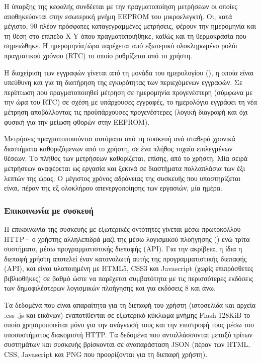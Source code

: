 Η ύπαρξης της κεφαλής συνδέεται με την πραγματοποίηση μετρήσεων οι οποίες
αποθηκεύονται στην εσωτερική μνήμη EEPROM του μικροελεγκτή. Οι, κατά μέγιστο, 90
πλέον πρόσφατες καταγεγραμμένες μετρήσεις, φέρουν την ημερομηνία και τη θέση στο
επίπεδο X-Y όπου πραγματοποιήθηκε, καθώς και τη θερμοκρασία που σημειώθηκε.
Η ημερομηνία\slash{}ώρα παρέχεται από εξωτερικό ολοκληρωμένο ρολόι πραγματικού
χρόνου (RTC) το οποίο ρυθμίζεται από το χρήστη.

Η διαχείριση των εγγραφών γίνεται από τη μονάδα του ημερολογίου (), η
οποία είναι υπεύθυνη και για τη διατήρηση της εγκυρότητας των περιεχόμενων
εγγραφών. Σε περίπτωση που πραγματοποιηθεί μέτρηση σε ημερομηνία προγενέστερη
(σύμφωνα με την ώρα του RTC) σε σχέση με υπάρχουσες εγγραφές, το ημερολόγιο
εγγράφει τη νέα μέτρηση αποβάλλοντας τις προϋπάρχουσες προγενέστερες (λογική
διαγραφή και όχι φυσική για την μείωση φθορών στην EEPROM).

Μετρήσεις πραγματοποιούνται αυτόματα από τη συσκευή ανά σταθερά χρονικά
διαστήματα καθοριζόμενων από το χρήστη, σε ένα πλήθος τυχαία επιλεγμένων θέσεων.
Το πλήθος των μετρήσεων καθορίζεται, επίσης, από το χρήστη. Μία σειρά μετρήσεων
αναφέρεται ως εργασία και ξεκινά σε διαστήματα πολλαπλάσια των έξι λεπτών της
ώρας. Ο μέγιστος χρόνος αδράνειας της συσκευής που υποστηρίζεται είναι, πέραν
της εξ ολοκλήρου απενεργοποίησης των εργασιών, μία ημέρα.


\subsubsection{Επικοινωνία με συσκευή}

Η επικοινωνία της συσκευής με εξωτερικές οντότητες γίνεται μέσω πρωτοκόλλου
HTTP· ο χρήστης αλληλεπιδρά μαζί της μέσω λογισμικού πλοήγησης ()
ενώ τρίτα συστήματα, μέσω προγραμματιστικής διεπαφής (API).
Για την ακρίβεια, η ίδια η διεπαφή χρήστη αποτελεί έναν καταναλωτή αυτής της
προγραμματιστικής διεπαφής (API), και είναι υλοποιημένη με HTML5, CSS3 και
Javascript (χωρίς επιπρόσθετες βιβλιοθήκες) σε βαθμό ώστε να παρέχεται
συμβατότητα με τις περισσότερες εκδόσεις των δημοφιλέστερων λογισμικών πλοήγησης
και για εκδόσεις  8 και άνω.

Τα δεδομένα που είναι απαραίτητα για τη διεπαφή του χρήστη (ιστοσελίδα και
αρχεία \@.css \@.js και εικόνων) εναποτίθενται σε εξωτερικό κύκλωμα μνήμης Flash
128KiB το οποίο χρησιμοποιείται μόνο για την ανάγνωσή τους και την επιστροφή
τους μέσω του υποσυστήματος διακομιστή HTTP.
Τα δεδομένα που ανταλλάσσονται μεταξύ τρίτων συστημάτων και συσκευής βρίσκονται
σε αναπαράσταση JSON (πέραν των HTML, CSS, Javascript και PNG που προορίζονται
για τη διεπαφή χρήστη).

